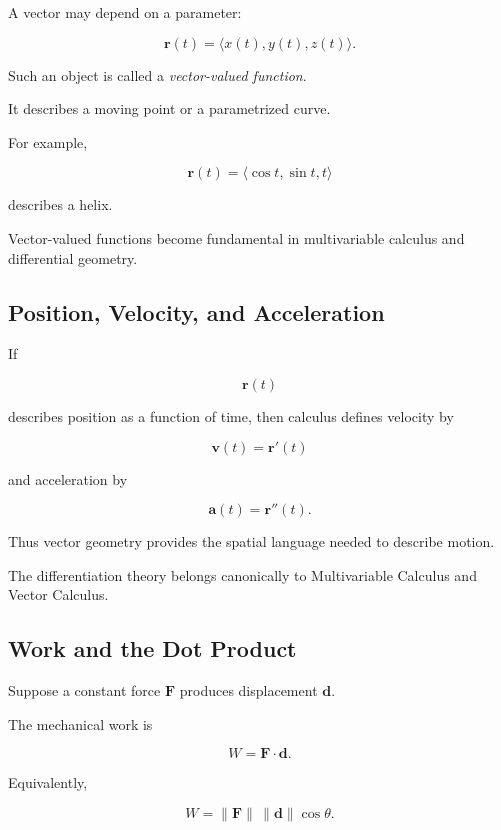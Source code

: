 A vector may depend on a parameter:

\[
\mathbf{r}(t)
=
\langle
x(t),
y(t),
z(t)
\rangle.
\]

Such an object is called a \emph{vector-valued function}.

It describes a moving point or a parametrized curve.

For example,

\[ \mathbf{r}(t)=\langle\cos t,\sin t,t\rangle \]

describes a helix.

Vector-valued functions become fundamental in multivariable calculus and
differential geometry.

\subsection{Position, Velocity, and Acceleration}
\label{subsec:position-velocity-acceleration-preview}

If

\[ \mathbf{r}(t) \]

describes position as a function of time, then calculus defines velocity by

\[ \mathbf{v}(t)=\mathbf{r}'(t) \]

and acceleration by

\[ \mathbf{a}(t)=\mathbf{r}''(t). \]

Thus vector geometry provides the spatial language needed to describe
motion.

The differentiation theory belongs canonically to Multivariable Calculus
and Vector Calculus.

\subsection{Work and the Dot Product}
\label{subsec:work-dot-product}

Suppose a constant force \(\mathbf{F}\) produces displacement
\(\mathbf{d}\).

The mechanical work is

\[ \boxed{W=\mathbf{F}\cdot\mathbf{d}.} \]

Equivalently,

\[ W=\|\mathbf{F}\|\,\|\mathbf{d}\|\cos\theta. \]

